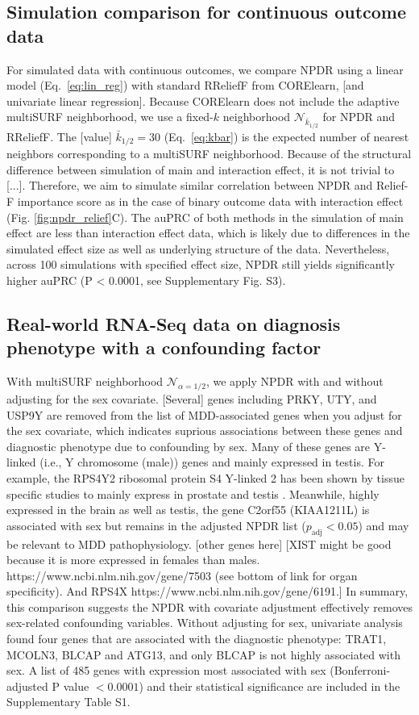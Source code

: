 \documentclass[10pt]{article}
\begin{document}
\subsection{Simulation comparison for continuous outcome data} 
For simulated data with continuous outcomes, we compare NPDR using a linear model (Eq.~\ref{eq:lin_reg}) with standard RReliefF from CORElearn, [and univariate linear regression].
Because CORElearn does not include the adaptive multiSURF neighborhood, we use a fixed-$k$ neighborhood $\mathcal{N}_{\bar{k}_{1/2}}$ for NPDR and RReliefF.
The [value] $\bar{k}_{1/2}=30$ (Eq.~\ref{eq:kbar}) is the expected number of nearest neighbors corresponding to a multiSURF neighborhood.
Because of the structural difference between simulation of main and interaction effect, it is not trivial to [...].
Therefore, we aim to simulate similar correlation between NPDR and Relief-F importance score as in the case of binary outcome data with interaction effect (Fig. \ref{fig:npdr_relief}C).
The auPRC of both methods in the simulation of main effect are less than interaction effect data, which is likely due to differences in the simulated effect size as well as underlying structure of the data.
Nevertheless, across 100 simulations with specified effect size, NPDR still yields significantly higher auPRC (P < 0.0001, see Supplementary Fig. S3).


\subsection{Real-world RNA-Seq data on diagnosis phenotype with a confounding factor}
With multiSURF neighborhood $\mathcal{N}_{\alpha=1/2}$, we apply NPDR with and without adjusting for the sex covariate.
[Several] genes including PRKY, UTY, and USP9Y are removed from the list of MDD-associated genes when you adjust for the sex covariate, which indicates suprious associations between these genes and diagnostic phenotype due to confounding by sex.
Many of these genes are Y-linked (i.e., Y chromosome (male)) genes and mainly expressed in testis.
For example, the RPS4Y2 ribosomal protein S4 Y-linked 2 has been shown by tissue specific studies to mainly express in prostate and testis \cite{lopes2010human}.
Meanwhile, highly expressed in the brain as well as testis, the gene C2orf55 (KIAA1211L) is associated with sex but remains in the adjusted NPDR list ($p_\textrm{adj} < 0.05$) and may be relevant to MDD pathophysiology.
[other genes here]
[XIST might be good because it is more expressed in females than males. https://www.ncbi.nlm.nih.gov/gene/7503 (see bottom of link for organ specificity).
And RPS4X https://www.ncbi.nlm.nih.gov/gene/6191.]
In summary, this comparison suggests the NPDR with covariate adjustment effectively removes sex-related confounding variables.
Without adjusting for sex, univariate analysis found four genes that are associated with the diagnostic phenotype: TRAT1, MCOLN3, BLCAP and ATG13, and only BLCAP is not highly associated with sex.
A list of 485 genes with expression most associated with sex (Bonferroni-adjusted P value $<0.0001$) and their statistical significance are included in the Supplementary Table S1.
\end{document}
